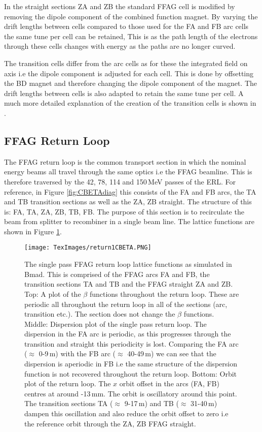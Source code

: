 \documentclass[11pt]{article}
\begin{document}
In the straight sections ZA and ZB the standard FFAG cell is modified by removing the dipole component of the combined function magnet. By varying the drift lengths between cells compared to those used for the FA and FB arc cells the same tune per cell can be retained, This is as the path length of the electrons through these cells changes with energy as the paths are no longer curved.

The transition cells differ from the arc cells as for these the integrated field on axis i.e the dipole component is adjusted for each cell. This is done by offsetting the BD magnet and therefore changing the dipole component of the magnet. The drift lengths between cells is also adapted to retain the same tune per cell. A much more detailed explanation of the creation of the transition cells is shown in \cite{CBETATDR}.    

\subsection{FFAG Return Loop}

The FFAG return loop is the common transport section in which the nominal energy beams all travel through the same optics i.e the FFAG beamline. This is therefore traversed by the 42, 78, 114 and 150\,MeV passes of the ERL. For reference, in Figure \ref{fig:CBETAdiag} this consists of the FA and FB arcs, the TA and TB transition sections as well as the ZA, ZB straight. The structure of this is: FA, TA, ZA, ZB, TB, FB. The purpose of this section is to recirculate the beam from splitter to recombiner in a single beam line. The lattice functions are shown in Figure \ref{fig:return1CBETA}.

\begin{figure}[H]
\centering
\texttt{[image: TexImages/return1CBETA.PNG]}
\caption{\label{fig:return1CBETA} The single pass FFAG return loop lattice functions as simulated in Bmad. This is comprised of the FFAG arcs FA and FB, the transition sections TA and TB and the FFAG straight ZA and ZB. Top: A plot of the $\beta$ functions throughout the return loop. These are periodic all throughout the return loop in all of the sections (arc, transition etc.). The section does not change the $\beta$ functions. Middle: Dispersion plot of the single pass return loop. The dispersion in the FA arc is periodic, as this progresses through the transition and straight this periodicity is lost. Comparing the FA arc ($\approx$ 0-9\,m) with the FB arc ($\approx$ 40-49\,m) we can see that the dispersion is aperiodic in FB i.e the same structure of the dispersion function is not recovered throughout the return loop. Bottom: Orbit plot of the return loop. The $x$ orbit offset in the arcs (FA, FB) centres at around -13\,mm. The orbit is oscillatory around this point. The transition sections TA ($\approx$ 9-17\,m) and TB ($\approx$ 31-40\,m) dampen this oscillation and also reduce the orbit offset to zero i.e the reference orbit through the ZA, ZB FFAG straight.}
\end{figure}
\end{document}
